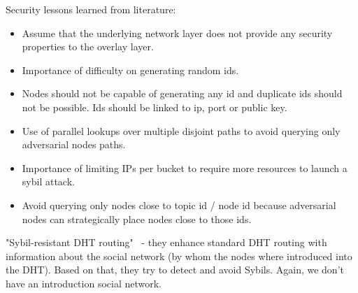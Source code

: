 

Security lessons learned from literature:
\begin{itemize}
\item Assume that the underlying network layer does not provide any security properties to the overlay layer.
\item Importance of difficulty on generating random ids.
\item Nodes should not be capable of generating any id and duplicate ids should not be possible. Ids should be linked to ip, port or public key.
\item Use of parallel lookups over multiple disjoint paths to avoid querying only  adversarial nodes paths.
\item Importance of limiting IPs per bucket to require more resources to launch a sybil attack.
\item Avoid querying only nodes close to topic id / node id because adversarial nodes can strategically place nodes close to those ids.
\end{itemize}



"Sybil-resistant DHT routing"~\cite{danezis2005sybil} - they enhance standard DHT routing with information about the social network (by whom the nodes where introduced into the DHT). Based on that, they try to detect and avoid Sybils. Again, we don't have an introduction social network. 

